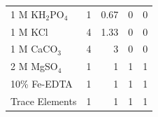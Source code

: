 \begin{table}[h!]
{\begin{tabular}{p{4cm}p{2cm}p{2cm}p{2cm}p{2cm}}
    1 M KH$_2$PO$_4$        & \multicolumn{1}{r}{1}                 & \multicolumn{1}{r}{0.67}              & \multicolumn{1}{r}{0}         & \multicolumn{1}{r}{0}  \\
    1 M KCl                 & \multicolumn{1}{r}{4}                 & \multicolumn{1}{r}{1.33}              & \multicolumn{1}{r}{0}         & \multicolumn{1}{r}{0}  \\
    1 M CaCO$_3$            & \multicolumn{1}{r}{4}                 & \multicolumn{1}{r}{3}                 & \multicolumn{1}{r}{0}         & \multicolumn{1}{r}{0} \\
    2 M MgSO$_4$            & \multicolumn{1}{r}{1}                 & \multicolumn{1}{r}{1}                 & \multicolumn{1}{r}{1}         & \multicolumn{1}{r}{1} \\
    10\% Fe-EDTA            & \multicolumn{1}{r}{1}                 & \multicolumn{1}{r}{1}                 & \multicolumn{1}{r}{1}         & \multicolumn{1}{r}{1} \\
    Trace Elements          & \multicolumn{1}{r}{1}                 & \multicolumn{1}{r}{1}                 & \multicolumn{1}{r}{1}         & \multicolumn{1}{r}{1} \\
    \hline
    \end{tabular}%
    }
    \end{table}
\clearpage

